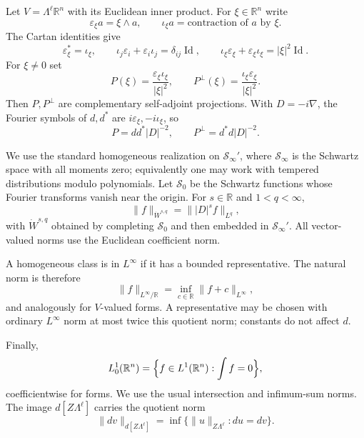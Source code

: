 \documentclass[11pt]{amsart}
\numberwithin{equation}{section}
\theoremstyle{definition}
\theoremstyle{remark}
\newcommand{\R}{\mathbb R}
\newcommand{\cS}{\mathcal S}
\newcommand{\eps}{\varepsilon}
\newcommand{\ii}{\iota}
\newcommand{\Id}{\operatorname{Id}}
\newcommand{\norm}[1]{\lVert #1\rVert}
\begin{document}
Let $V=\Lambda^\ell\R^n$ with its Euclidean inner product.  For
$\xi\in\R^n$ write
\[
 \eps_\xi a=\xi\wedge a,\qquad
 \ii_\xi a=\text{contraction of $a$ by $\xi$}.
\]
The Cartan identities give
\begin{equation}\label{eq:cartan}
 \eps_\xi^*=\ii_\xi,\qquad
 \ii_j\eps_i+\eps_i\ii_j=\delta_{ij}\Id,\qquad
 \ii_\xi\eps_\xi+\eps_\xi\ii_\xi=|\xi|^2\Id.
\end{equation}
For $\xi\ne0$ set
\begin{equation}\label{eq:hodge-symbols}
 P(\xi)=\frac{\eps_\xi\ii_\xi}{|\xi|^2},\qquad
 P^\perp(\xi)=\frac{\ii_\xi\eps_\xi}{|\xi|^2}.
\end{equation}
Then $P,P^\perp$ are complementary self-adjoint projections.  With
$D=-i\nabla$, the Fourier symbols of $d,d^*$ are $i\eps_\xi,-i\ii_\xi$, so
\begin{equation}\label{eq:hodge-multiplier}
 P=dd^*|D|^{-2},\qquad P^\perp=d^*d|D|^{-2}.
\end{equation}

We use the standard homogeneous realization on
$\cS_\infty'$, where $\cS_\infty$ is the Schwartz space with all moments
zero; equivalently one may work with tempered distributions modulo
polynomials.  Let $\cS_0$ be the Schwartz functions whose Fourier transforms
vanish near the origin.  For $s\in\R$ and $1<q<\infty$,
\[
 \norm f_{\dot W^{s,q}}=\norm{|D|^sf}_{L^q},
\]
with $\dot W^{s,q}$ obtained by completing $\cS_0$ and then embedded in
$\cS_\infty'$.  All vector-valued norms use the Euclidean coefficient norm.

A homogeneous class is in $L^\infty$ if it has a bounded representative.
The natural norm is therefore
\begin{equation}\label{eq:Linfty-mod-constants}
 \norm f_{L^\infty/\R}=\inf_{c\in\R}\norm{f+c}_{L^\infty},
\end{equation}
and analogously for $V$-valued forms.  A representative may be chosen with
ordinary $L^\infty$ norm at most twice this quotient norm; constants do not
affect $d$.

Finally,
\begin{equation}\label{eq:L10}
 L^1_0(\R^n)=\Bigl\{f\in L^1(\R^n):\int f=0\Bigr\},
\end{equation}
coefficientwise for forms.  We use the usual intersection and infimum-sum
norms.  The image $d[Z\Lambda^\ell]$ carries the quotient norm
\begin{equation}\label{eq:image-quotient}
 \norm{dv}_{d[Z\Lambda^\ell]}
 =\inf\{\norm{u}_{Z\Lambda^\ell}:du=dv\}.
\end{equation}
\end{document}
